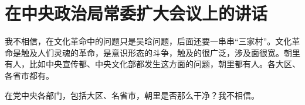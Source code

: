\section[在中央政治局常委扩大会议上的讲话（一九六六年四月二十二日）]{在中央政治局常委扩大会议上的讲话}


我不相信，在文化革命中的问题只是吴晗问题，后面还要一串串“三家村”。文化革命是触及人们灵魂的革命，是意识形态的斗争，触及的很广泛，涉及面很宽。朝里有人，比如中央宣传都、中央文化部都发生这方面的问题，朝里都有人。各大区、各省市都有。

在党中央各部门，包括大区、名省市，朝里是否那么干净？我不相信。



